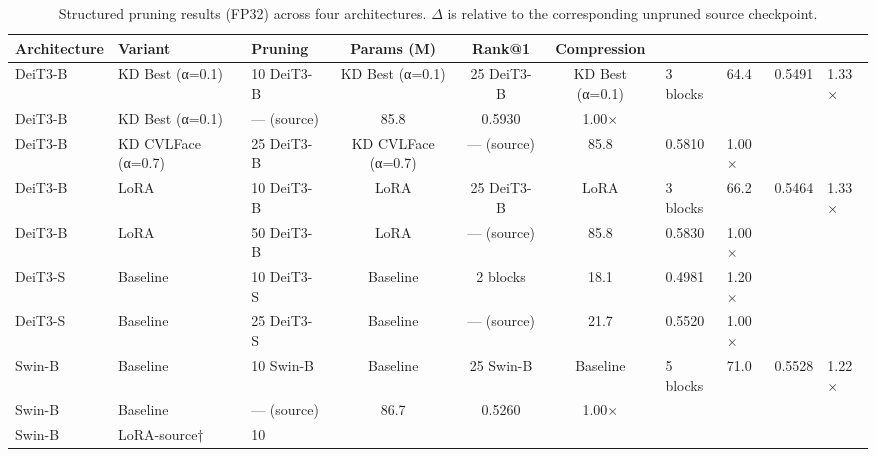 \begin{table}[t]
\centering
\caption{Structured pruning results (FP32) across four architectures.
$\Delta$ is relative to the corresponding unpruned source checkpoint.}
\label{tab:pruning-full}
\footnotesize
\begin{tabular*}{\linewidth}{@{\extracolsep{\fill}} l l l c c c}
\toprule
Architecture & Variant & Pruning & Params (M) & Rank@1 & Compression \\
\midrule
DeiT3-B & KD Best (α=0.1) & 10%
DeiT3-B & KD Best (α=0.1) & 25%
DeiT3-B & KD Best (α=0.1) & 3 blocks & 64.4 & 0.5491 & 1.33$\times$ \\
DeiT3-B & KD Best (α=0.1) & --- (source) & 85.8 & 0.5930 & 1.00$\times$ \\
DeiT3-B & KD CVLFace (α=0.7) & 25%
DeiT3-B & KD CVLFace (α=0.7) & --- (source) & 85.8 & 0.5810 & 1.00$\times$ \\
DeiT3-B & LoRA & 10%
DeiT3-B & LoRA & 25%
DeiT3-B & LoRA & 3 blocks & 66.2 & 0.5464 & 1.33$\times$ \\
DeiT3-B & LoRA & 50%
DeiT3-B & LoRA & --- (source) & 85.8 & 0.5830 & 1.00$\times$ \\
\midrule
DeiT3-S & Baseline & 10%
DeiT3-S & Baseline & 2 blocks & 18.1 & 0.4981 & 1.20$\times$ \\
DeiT3-S & Baseline & 25%
DeiT3-S & Baseline & --- (source) & 21.7 & 0.5520 & 1.00$\times$ \\
\midrule
Swin-B & Baseline & 10%
Swin-B & Baseline & 25%
Swin-B & Baseline & 5 blocks & 71.0 & 0.5528 & 1.22$\times$ \\
Swin-B & Baseline & --- (source) & 86.7 & 0.5260 & 1.00$\times$ \\
Swin-B & LoRA-source† & 10%

\end{tabular*}
\end{table}
